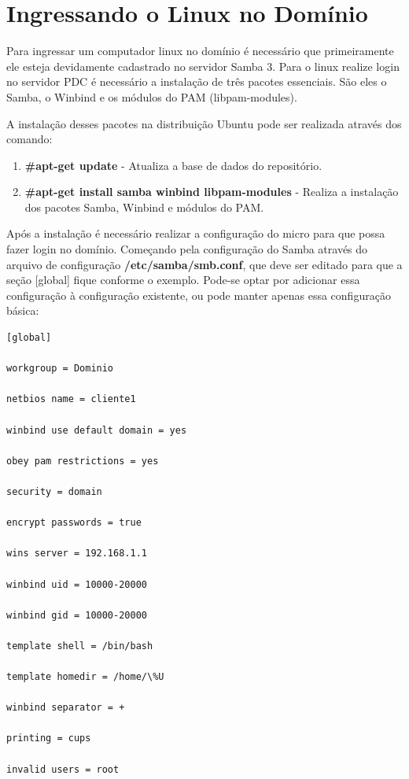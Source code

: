 
\section{Ingressando o Linux no Domínio}

Para ingressar um computador linux no domínio é necessário que primeiramente ele esteja devidamente cadastrado no servidor Samba 3. Para o linux realize login no servidor PDC é necessário a instalação de três pacotes essenciais. São eles o Samba, o Winbind e os módulos do PAM (libpam-modules).

A instalação desses pacotes na distribuição Ubuntu pode ser realizada através dos comando:

\begin{enumerate}
	\item \textbf{\#apt-get update} - Atualiza a base de dados do repositório.
	\item \textbf{\#apt-get install samba winbind libpam-modules} - Realiza a instalação dos pacotes Samba, Winbind e módulos do PAM.
\end{enumerate}

Após a instalação é necessário realizar a configuração do micro para que possa fazer login no domínio. Começando pela configuração do Samba através do arquivo de configuração \textbf{/etc/samba/smb.conf}, que deve ser editado para que a seção [global] fique conforme o exemplo. Pode-se optar por adicionar essa configuração à configuração existente, ou pode manter apenas essa configuração básica:\\

\begin{lstlisting}	
[global]

workgroup = Dominio

netbios name = cliente1

winbind use default domain = yes

obey pam restrictions = yes

security = domain

encrypt passwords = true

wins server = 192.168.1.1

winbind uid = 10000-20000

winbind gid = 10000-20000

template shell = /bin/bash

template homedir = /home/\%U

winbind separator = +

printing = cups

invalid users = root	
\end{lstlisting}

